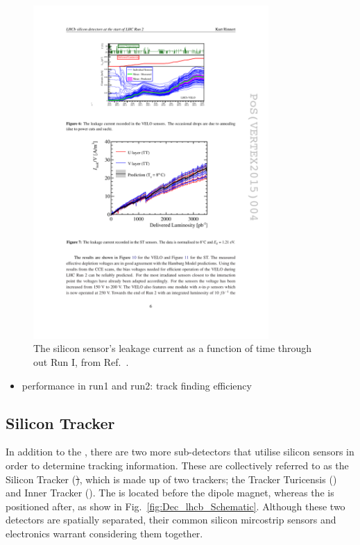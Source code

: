 \begin{figure}[!h]
    \centering
    \includegraphics[width=0.8\textwidth]{figs/Detector/velo_leakage_current.pdf}
    \caption{The \velo silicon sensor's leakage current as a function of time through out Run I, from Ref.~\cite{Rinnert:2015uns}.}
    \label{fig:Dec_velo_leakage_current}   
\end{figure}


{\color{Red}
\begin{itemize}
\item performance in run1 and run2: track finding efficiency 
\end{itemize}
}




\subsection{Silicon Tracker}

In addition to the \velo, there are two more sub-detectors that utilise silicon sensors in order to determine tracking information. These are collectively referred to as the Silicon Tracker (\st), which is made up of two trackers; the Tracker Turicensis (\ttracker) and Inner Tracker (\intr). The \ttracker is located before the dipole magnet, whereas the \intr is positioned after, as show in Fig.~\ref{fig:Dec_lhcb_Schematic}. Although these two detectors are spatially separated, their common silicon mircostrip sensors and electronics warrant considering them together.

